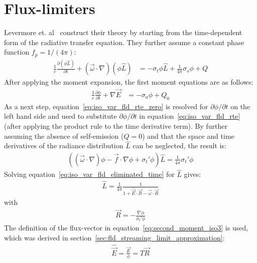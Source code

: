 \section{Flux-limiters}
\label{sec:fld_vef_factors}

Levermore et. al~\cite{Levermore81} construct their theory by starting from the time-dependent form of the radiative transfer equation. They further assume a constant phase function $f_p=1/(4\pi)$:
\begin{align}
\label{eq:iso_var_fld_rte}
\frac{1}{c}\frac{\partial (\phi\hat{L})}{\partial t} + \left(\vec{\omega}\cdot\nabla\right)(\phi\hat{L})&=-\sigma_t\phi\hat{L} + \frac{1}{4\pi}\sigma_s\phi + Q
\end{align}
After applying the moment expansion, the first moment equations are as follows:
\begin{align}
\label{eq:iso_var_fld_rte_zero}
\frac{1}{c}\frac{\partial \phi}{\partial t} + \nabla\vec{E} &= -\sigma_a\phi + Q_0
\end{align}
As a next step, equation~\ref{eq:iso_var_fld_rte_zero} is resolved for $\partial \phi/\partial t$ on the left hand side and used to substitute $\partial\phi/\partial t$ in equation~\ref{eq:iso_var_fld_rte} (after applying the product rule to the time derivative term). By further assuming the absence of self-emission ($Q=0$) and that the space and time derivatives of the radiance distribution $\hat{L}$ can be neglected, the result is:
\begin{align}
\label{eq:iso_var_fld_eliminated_time}
\left( \left(\vec{\omega}\cdot\nabla\right)\phi -\vec{f}\cdot\nabla\phi + \sigma_t'\phi\right)\hat{L} = \frac{1}{4\pi}\sigma_t'\phi
\end{align}
Solving equation~\ref{eq:iso_var_fld_eliminated_time} for $\hat{L}$ gives:
\begin{align}
\label{eq:iso_var_fld_Lhat}
\hat{L} = \frac{1}{4\pi}\frac{1}{1+\widehat{\vec{E}}\cdot\vec{R}-\vec{\omega}\cdot\vec{R}}
\end{align}
with
\begin{align}
\label{eq:iso_var_fld_R}
\vec{R} = -\frac{\nabla\phi}{\sigma_t'\phi}
\end{align}
The definition of the flux-vector in equation~\ref{eq:second_moment_iso3} is used, which was derived in section~\ref{sec:fld_streaming_limit_approximation}:
\begin{align}
\widehat{\vec{E}} = \frac{\vec{E}}{\phi}= T\vec{R}
\label{eq:iso_var_fld_normalized_flux}
\end{align}

